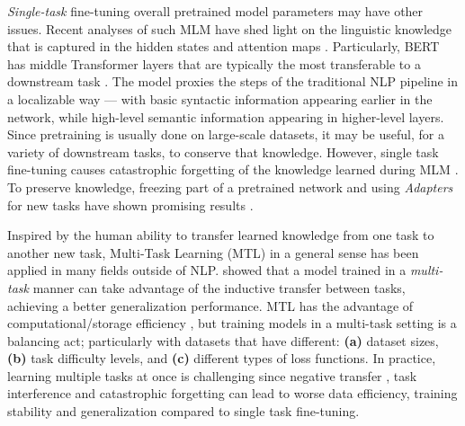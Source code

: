 \documentclass{article} \usepackage{iclr2021_conference,times}
\begin{document}
\emph{Single-task} fine-tuning overall pretrained model parameters may have other issues. Recent analyses of such MLM have shed light on the linguistic knowledge that is captured in the hidden states and attention maps \citep{bert_analysis,bert_classicnlp,merchant2020happens}. Particularly, BERT has middle Transformer \citep{transformer} layers that are typically the most transferable to a downstream task \citep{trans_context}. The model proxies the steps of the traditional NLP pipeline in a localizable way \citep{bert_classicnlp} --- with basic syntactic information appearing earlier in the network, while high-level semantic information appearing in higher-level layers. Since pretraining is usually done on large-scale datasets, it may be useful, for a variety of downstream tasks, to conserve that knowledge. However, single task fine-tuning causes catastrophic forgetting of the knowledge learned during MLM \citep{howard-ruder-2018-universal}. To preserve knowledge, freezing part of a pretrained network and using \emph{Adapters} for new tasks have shown promising results \citep{DBLP:journals/corr/abs-1902-00751}.


Inspired by the human ability to transfer learned knowledge from one task to another new task, Multi-Task Learning (MTL) in a general sense \citep{mtl_caruana1997,squad_rajpurkar2016,Ruder2017AnOO} has been applied in many fields outside of NLP. \citet{Caruana93multitasklearning} showed that a model trained in a \emph{multi-task} manner can take advantage of the inductive transfer between tasks, achieving a better generalization performance. MTL has the advantage of computational/storage efficiency \citep{DBLP:journals/corr/ZhangY17aa}, but training models in a multi-task setting is a balancing act; particularly with datasets that have different: \textbf{(a)} dataset sizes, \textbf{(b)} task difficulty levels, and \textbf{(c)} different types of loss functions. In practice, learning multiple tasks at once is challenging since negative transfer \citep{wang-acl-19}, task interference \citep{Wu2020Understanding,yu2020gradient} and catastrophic forgetting \citep{DBLP:conf/icml/SerraSMK18} can lead to worse data efficiency, training stability and generalization compared to single task fine-tuning.
\end{document}
